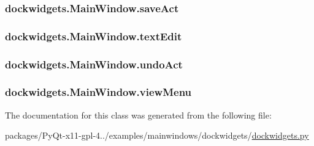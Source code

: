 \subsubsection[{save\+Act}]{\setlength{\rightskip}{0pt plus 5cm}dockwidgets.\+Main\+Window.\+save\+Act}\label{classdockwidgets_1_1MainWindow_ab20079448e2e38afe9032db4aa6538b5}
\hypertarget{classdockwidgets_1_1MainWindow_a5da9f07ece704f53a540ab38b866037b}{}
\subsubsection[{text\+Edit}]{\setlength{\rightskip}{0pt plus 5cm}dockwidgets.\+Main\+Window.\+text\+Edit}\label{classdockwidgets_1_1MainWindow_a5da9f07ece704f53a540ab38b866037b}
\hypertarget{classdockwidgets_1_1MainWindow_a759eb2cdda313af53c1658207b368a80}{}
\subsubsection[{undo\+Act}]{\setlength{\rightskip}{0pt plus 5cm}dockwidgets.\+Main\+Window.\+undo\+Act}\label{classdockwidgets_1_1MainWindow_a759eb2cdda313af53c1658207b368a80}
\hypertarget{classdockwidgets_1_1MainWindow_a68f69e95c0f284c73c6d70111be5d04b}{}
\subsubsection[{view\+Menu}]{\setlength{\rightskip}{0pt plus 5cm}dockwidgets.\+Main\+Window.\+view\+Menu}\label{classdockwidgets_1_1MainWindow_a68f69e95c0f284c73c6d70111be5d04b}


The documentation for this class was generated from the following file\+:\begin{DoxyCompactItemize}
\item 
packages/\+Py\+Qt-\/x11-\/gpl-\/4../examples/mainwindows/dockwidgets/\hyperlink{dockwidgets_8py}{dockwidgets.\+py}\end{DoxyCompactItemize}
